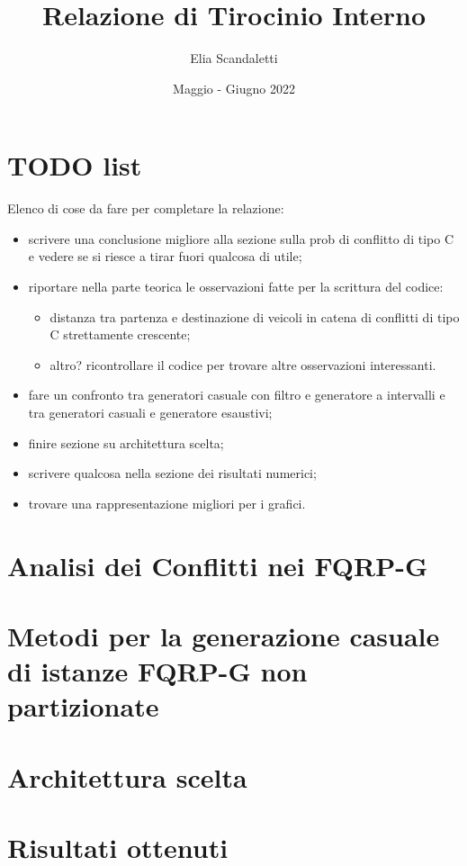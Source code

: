 

\title{Relazione di Tirocinio Interno}
\author{Elia Scandaletti}
\date{Maggio - Giugno 2022}



\maketitle
\tableofcontents

\section*{TODO list}
Elenco di cose da fare per completare la relazione:
\begin{itemize}
    \item scrivere una conclusione migliore alla sezione sulla prob di conflitto di tipo C e vedere se si riesce a tirar fuori qualcosa di utile;
    \item riportare nella parte teorica le osservazioni fatte per la scrittura del codice:
    \begin{itemize}
        \item distanza tra partenza e destinazione di veicoli in catena di conflitti di tipo C strettamente crescente;
        \item altro? ricontrollare il codice per trovare altre osservazioni interessanti.
    \end{itemize}
    \item fare un confronto tra generatori casuale con filtro e generatore a intervalli e tra generatori casuali e generatore esaustivi;
    \item finire sezione su architettura scelta;
    \item scrivere qualcosa nella sezione dei risultati numerici;
    \item trovare una rappresentazione migliori per i grafici.
\end{itemize}

\section{Analisi dei Conflitti nei FQRP-G}


\section{Metodi per la generazione casuale di istanze FQRP-G non partizionate}


\section{Architettura scelta}


\section{Risultati ottenuti}


